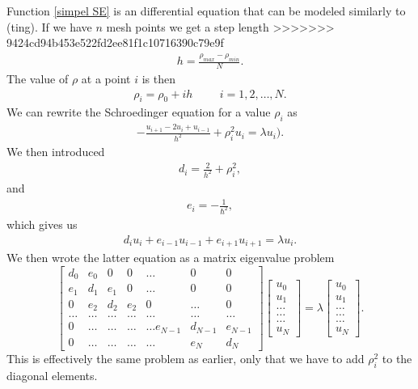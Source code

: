 \documentclass[a4paper]{article}
\begin{document}
Function \ref{simpel SE} is an differential equation that can be modeled similarly to (ting). If we have $n$ mesh points we get a step length
>>>>>>> 9424cd94b453e522fd2ee81f1c10716390c79e9f
\begin{align}
h = \frac{\rho_{max} - \rho_{min}}{N}.
\end{align}
The value of $\rho$ at a point $i$ is then 
\begin{align}
\rho_i= \rho_0 + ih \hspace{1cm} i=1,2,\dots , N.
\end{align}
We can rewrite the Schroedinger equation for a value $\rho_i$ as
\begin{align}
-\frac{u_{i+1} -2u_i +u_{i-1}}{h^2}+\rho_i^2u_i = \lambda u_i).
\end{align}
We then introduced
\begin{align}
   d_i=\frac{2}{h^2}+\rho_{i}^2,
\end{align}
and
\begin{align}
e_{i} = -\frac{1}{\hbar^2},
\end{align}
which gives us
\begin{align}
d_iu_i+e_{i-1}u_{i-1}+e_{i+1}u_{i+1}  = \lambda u_i.
\end{align}
We then wrote the latter equation as a matrix eigenvalue problem
\begin{equation}
\begin{bmatrix}d_0 & e_0 & 0   & 0    & \dots  &0     & 0 \\
e_1 & d_1 & e_1 & 0    & \dots  &0     &0 \\
0   & e_2 & d_2 & e_2  &0       &\dots & 0\\
\dots  & \dots & \dots & \dots  &\dots      &\dots & \dots\\
0   & \dots & \dots & \dots  &\dots  e_{N-1}     &d_{N-1} & e_{N-1}\\
0   & \dots & \dots & \dots  &\dots       &e_{N} & d_{N}
\end{bmatrix}  \begin{bmatrix} u_{0} \\
u_{1} \\
\dots\\ \dots\\ \dots\\
u_{N}
\end{bmatrix}=\lambda \begin{bmatrix} u_{0} \\
u_{1} \\
\dots\\ \dots\\ \dots\\
u_{N}
\end{bmatrix}.  
\label{eq:sematrix}
\end{equation}
This is effectively the same problem as earlier, only that we have to add $\rho_{i}^2$ to the diagonal elements. 
\end{document}
